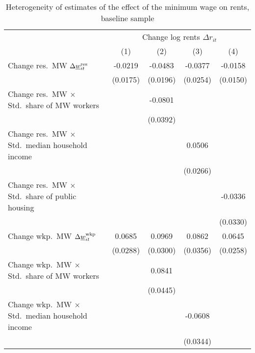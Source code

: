 \begin{table}[hbt!] \centering
    \caption{Heterogeneity of estimates of the effect of the minimum wage on rents, 
             baseline sample}
    \label{tab:heterogeneity}
    \begin{tabular}{@{}lcccc@{}}
        \toprule
            & \multicolumn{4}{c}{Change log rents $\Delta r_{it}$}                                                \\ \cmidrule(l){2-5} 
            & (1) & (2) & (3) & (4)                                                               \\ \midrule
        Change res.\ MW $\Delta\underline{w}_{it}^{\text{res}}$                &  -0.0219   &  -0.0483  &  -0.0377   &  -0.0158   \\
                                                               & (0.0175)  & (0.0196) & (0.0254)  & (0.0150)  \\
        Change res.\ MW $\times$ Std.\ share of MW workers     &        &  -0.0801  &        &        \\
                                                               &        & (0.0392) &        &        \\
        Change res.\ MW $\times$ Std.\ median household income &        &       &  0.0506   &        \\
                                                               &        &       & (0.0266)  &        \\
        Change res.\ MW $\times$ Std.\ share of public housing &        &       &        &  -0.0336   \\
                                                               &        &       &        & (0.0330)  \\
        Change wkp.\ MW $\Delta\underline{w}_{it}^{\text{wkp}}$                &  0.0685   &  0.0969  &  0.0862   &  0.0645   \\
                                                               & (0.0288)  & (0.0300) & (0.0356)  & (0.0258)  \\
        Change wkp.\ MW $\times$ Std.\ share of MW workers     &        &  0.0841  &        &        \\
                                                               &        & (0.0445) &        &        \\
        Change wkp.\ MW $\times$ Std.\ median household income &        &       &  -0.0608   &        \\
                                                               &        &       & (0.0344)  &        \\

\end{tabular}
\end{table}
